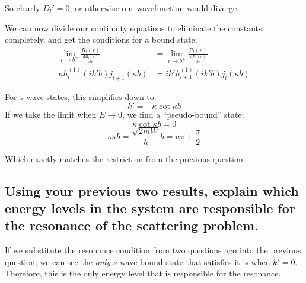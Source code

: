 \documentclass[a4paper]{scrartcl}
\begin{document}
So clearly \(D_l' = 0\), or otherwise our wavefunction would diverge.

We can now divide our continuity equations to eliminate the constants completely, and get the conditions for a bound state:
\begin{align*}
    \lim_{r \to b^-} \frac{R_l(r)}{\frac{\mathrm{d} R_l(r)}{\mathrm{d} r}} &= \lim_{r \to b^+} \frac{R_l(r)}{\frac{\mathrm{d} R_l(r)}{\mathrm{d} r}} \\
    \kappa h_l^{(1)}(i k' b) j_{l + 1}(\kappa b) &= i k' h_{l + 1}^{(1)}(i k' b) j_l(\kappa b)
\end{align*}

For \(s\)-wave states, this simplifies down to:
\[k' = -\kappa \cot \kappa b\]
If we take the limit when \(E \to 0\), we find a ``pseudo-bound'' state:
\[\kappa \cot \kappa b = 0\]
\[\therefore \kappa b = \frac{\sqrt{2 m W}}{\hbar} b = n \pi + \frac{\pi}{2}\]

Which exactly matches the restriction from the previous question.

\subsection{Using your previous two results, explain which energy levels in the system are responsible for the resonance of the scattering problem.}
If we substitute the resonance condition from two questions ago into the previous question, we can see the \emph{only} \(s\)-wave bound state that satisfies it is when \(k' = 0\). Therefore, this is the only energy level that is responsible for the resonance.
\end{document}
